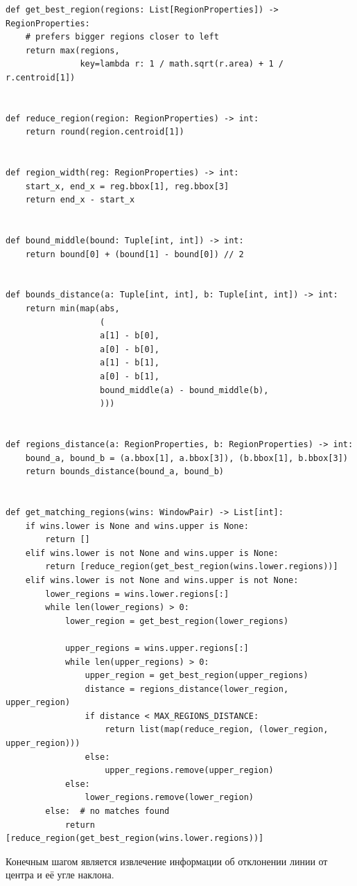 \documentclass[11pt]{article}
\begin{document}
\begin{verbatim}
def get_best_region(regions: List[RegionProperties]) -> RegionProperties:
    # prefers bigger regions closer to left
    return max(regions,
               key=lambda r: 1 / math.sqrt(r.area) + 1 / r.centroid[1])


def reduce_region(region: RegionProperties) -> int:
    return round(region.centroid[1])


def region_width(reg: RegionProperties) -> int:
    start_x, end_x = reg.bbox[1], reg.bbox[3]
    return end_x - start_x


def bound_middle(bound: Tuple[int, int]) -> int:
    return bound[0] + (bound[1] - bound[0]) // 2


def bounds_distance(a: Tuple[int, int], b: Tuple[int, int]) -> int:
    return min(map(abs,
                   (
                   a[1] - b[0],
                   a[0] - b[0],
                   a[1] - b[1],
                   a[0] - b[1],
                   bound_middle(a) - bound_middle(b),
                   )))


def regions_distance(a: RegionProperties, b: RegionProperties) -> int:
    bound_a, bound_b = (a.bbox[1], a.bbox[3]), (b.bbox[1], b.bbox[3])
    return bounds_distance(bound_a, bound_b)


def get_matching_regions(wins: WindowPair) -> List[int]:
    if wins.lower is None and wins.upper is None:
        return []
    elif wins.lower is not None and wins.upper is None:
        return [reduce_region(get_best_region(wins.lower.regions))]
    elif wins.lower is not None and wins.upper is not None:
        lower_regions = wins.lower.regions[:]
        while len(lower_regions) > 0:
            lower_region = get_best_region(lower_regions)

            upper_regions = wins.upper.regions[:]
            while len(upper_regions) > 0:
                upper_region = get_best_region(upper_regions)
                distance = regions_distance(lower_region, upper_region)
                if distance < MAX_REGIONS_DISTANCE:
                    return list(map(reduce_region, (lower_region, upper_region)))
                else:
                    upper_regions.remove(upper_region)
            else:
                lower_regions.remove(lower_region)
        else:  # no matches found
            return [reduce_region(get_best_region(wins.lower.regions))]
\end{verbatim}
Конечным шагом является извлечение информации об отклонении линии от центра и её угле наклона.
\end{document}
